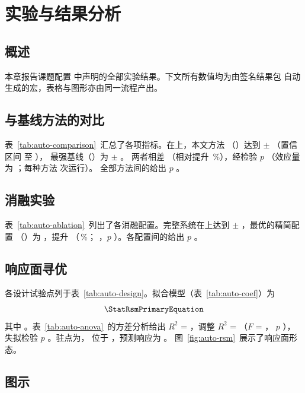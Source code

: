 \chapter{实验与结果分析}
\label{chap:experiments}

\section{概述}
本章报告课题配置 \texttt{\ThesisProfileId} 中声明的全部实验结果。下文所有数值均为由签名结果包
自动生成的宏，表格与图形亦由同一流程产出。



\ifAutoHasComparison
\section{与基线方法的对比}
表~\ref{tab:auto-comparison}~汇总了各项指标。在\MetricPrimaryName{}上，本文方法
（\MetricPrimaryProposedName）达到 \MetricPrimaryProposedMean{} $\pm$ \MetricPrimaryProposedStd{}
\MetricPrimaryUnit（置信区间 \MetricPrimaryProposedCiLow{} 至 \MetricPrimaryProposedCiHigh），
最强基线（\MetricPrimaryRunnerUpName）为 \MetricPrimaryRunnerUpMean{} $\pm$ \MetricPrimaryRunnerUpStd。
两者相差 \DiffPrimaryAbs（相对提升 \DiffPrimaryRelPct\,\%），经\StatPrimaryTest{}检验
$p$ \StatPrimaryPval（效应量 \StatPrimaryEffectName{} 为 \StatPrimaryEffect；每种方法 \StatPrimaryN{} 次运行）。
全部方法间的\StatPrimaryOmnibusTest{}给出 $p$ \StatPrimaryOmnibusPval。
\fi

\ifAutoHasAblation
\section{消融实验}
表~\ref{tab:auto-ablation}~列出了各消融配置。完整系统在\MetricPrimaryName{}上达到
\MetricPrimaryProposedMean{} $\pm$ \MetricPrimaryProposedStd{} \MetricPrimaryUnit，最优的精简配置
（\MetricPrimaryRunnerUpName）为 \MetricPrimaryRunnerUpMean，提升 \DiffPrimaryAbs（\DiffPrimaryRelPct\,\%；
\StatPrimaryTest，$p$ \StatPrimaryPval）。各配置间的\StatPrimaryOmnibusTest{}给出 $p$ \StatPrimaryOmnibusPval。
\fi

\ifAutoHasRsm
\section{响应面寻优}
各设计试验点列于表~\ref{tab:auto-design}。拟合模型（表~\ref{tab:auto-coef}）为
\begin{equation}
  \StatRsmPrimaryEquation
\end{equation}
其中 \StatRsmPrimaryFactorLegend。表~\ref{tab:auto-anova}~的方差分析给出
$R^{2}$ = \StatRsmPrimaryRsq，调整 $R^{2}$ = \StatRsmPrimaryRsqAdj（$F$ = \StatRsmPrimaryFvalue，
$p$ \StatRsmPrimaryPval），失拟检验 $p$ \StatRsmPrimaryLackOfFitPval。驻点为\StatRsmPrimaryOptNature，
位于 \StatRsmPrimaryOptPoint，预测响应为 \StatRsmPrimaryOptResponse{} \MetricPrimaryUnit。
图~\ref{fig:auto-rsm}~展示了响应面形态。
\fi

\section{图示}

